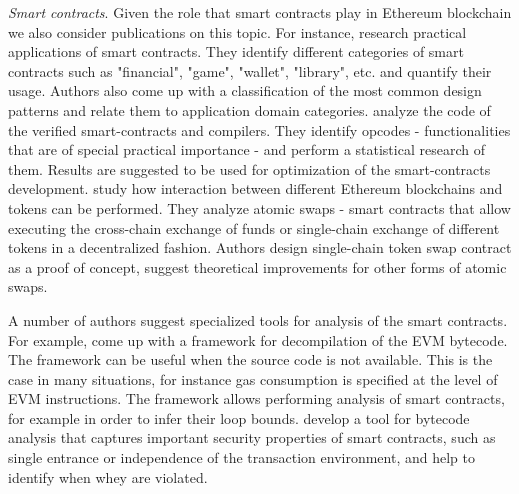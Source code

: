  

\textit{Smart contracts}. Given the role that smart contracts play in Ethereum blockchain we also consider publications on this topic. 
For instance, \cite{bartoletti2017dissecting} research practical applications of smart contracts. 
They identify different categories of smart contracts such as "financial", "game", "wallet", "library", etc. and quantify their usage.
Authors also come up with a classification of the most common design patterns and relate them to application domain categories.
\cite{bistarelli2019analysis} analyze the code of the verified smart-contracts and compilers. 
They identify opcodes - functionalities that are of special practical importance - and perform a statistical research of them. 
Results are suggested to be used for optimization of the smart-contracts development.
\cite{bennink2018analysis} study how interaction between different Ethereum blockchains and tokens can be performed. 
They analyze atomic swaps - smart contracts that allow executing the cross-chain exchange of funds or single-chain exchange of different tokens in a decentralized fashion.
Authors design single-chain token swap contract as a proof of concept, suggest theoretical improvements for other forms of atomic swaps.

A number of authors suggest specialized tools for analysis of the smart contracts. 
For example, \cite{albert2018ethir} come up with a framework for decompilation of the EVM bytecode.
The framework can be useful when the source code is not available.
This is the case in many situations, for instance gas consumption is specified at the level of EVM instructions.
The framework allows performing analysis of smart contracts, for example in order to infer their loop bounds.
\cite{grishchenkoethertrust} develop a tool for bytecode analysis that captures important security properties of smart contracts, such as single entrance or independence of the transaction environment, and help to identify when whey are violated.

